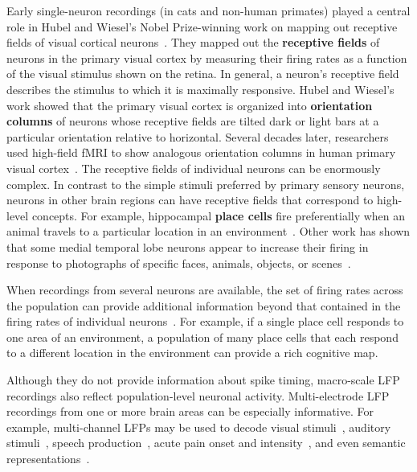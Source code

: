 \documentclass[runningheads]{llncs}
\begin{document}
Early single-neuron recordings (in cats and non-human primates) played
a central role in Hubel and Wiesel's Nobel Prize-winning work on
mapping out receptive fields of visual cortical
neurons~\citep{HubeWies62, HubeWies68}.  They mapped out the
\textbf{receptive fields} of neurons in the primary visual cortex by
measuring their firing rates as a function of the visual stimulus
shown on the retina.  In general, a neuron's receptive field describes
the stimulus to which it is maximally responsive.  Hubel and Wiesel's
work showed that the primary visual cortex is organized into
\textbf{orientation columns} of neurons whose receptive fields are
tilted dark or light bars at a particular orientation relative to
horizontal.  Several decades later, researchers used high-field fMRI
to show analogous orientation columns in human primary visual
cortex~\citep{YacoEtal08}.  The receptive fields of individual neurons
can be enormously complex.  In contrast to the simple stimuli
preferred by primary sensory neurons, neurons in other brain regions
can have receptive fields that correspond to high-level concepts.  For
example, hippocampal \textbf{place cells} fire preferentially when an
animal travels to a particular location in an
environment~\citep{Tolm48, EkstEtal03, KnieEtal95}.  Other work has
shown that some medial temporal lobe neurons appear to increase their
firing in response to photographs of specific faces, animals, objects,
or scenes~\citep{QuirEtal05}.

When recordings from several neurons are available, the set of firing
rates across the population can provide additional information beyond
that contained in the firing rates of individual
neurons~\citep{PougEtal00, AverEtal06}.  For example, if a single
place cell responds to one area of an environment, a population of
many place cells that each respond to a different location in the
environment can provide a rich cognitive map.

Although they do not provide information about spike timing,
macro-scale LFP recordings also reflect population-level neuronal
activity.  Multi-electrode LFP recordings from one or more brain areas
can be especially informative.  For example, multi-channel LFPs may be
used to decode visual stimuli~\citep{BeliEtal08, BeliEtal10}, auditory
stimuli~\citep{BeliEtal10, SmitEtal13d}, speech
production~\citep{PaslEtal12, HamiEtal21, ProiEtal22}, acute pain onset and
intensity~\citep{ZhanEtal18}, and even semantic
representations~\citep{DezfDali20, MannEtal12}.
\end{document}
